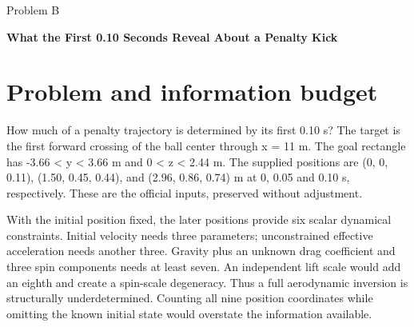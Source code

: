 \documentclass[11pt,a4paper]{article}
\begin{document}
\begin{titlepage}\thispagestyle{fancy}\fancyfoot{}
\centering\vspace*{0.4in}
{\Large Problem B\par}\vspace{0.35in}
{\LARGE\bfseries What the First 0.10 Seconds Reveal About a Penalty Kick\par}\vspace{0.35in}
\begin{abstract}
Predicting a penalty kick from only two positions after launch is an inverse problem with six dynamical constraints. We compare analytic constant-acceleration extrapolation, a gravity-plus-drag fit, and an aerodynamic ensemble that marginalizes unresolved drag, density and spin. Independent Gaussian coordinate errors are sensitivity assumptions, not measured camera specifications. In 1000 synthetic kicks observed through 0.10 s with 0.01 m coordinate noise, paired goal-plane RMSEs are 1.07, 0.45 and 0.41 m, respectively; the ensemble nominal 95\% ellipse covers 94.6\% of airborne truths. For the supplied kick, the conditional ensemble mean is (y, z) = (3.08, 1.92) m at 0.396 s, and the most likely spatial location is approximately (3.21, 1.90) m. The joint 95\% ellipse has semiaxes 0.61 and 0.64 m; geometric center-point goal probability is 96.5\% under the stated prior. Unknown aerodynamics dominate conditional position noise. Longer observation reduces point error in an extended experiment, while undercoverage accompanies low effective sample sizes. Short observations support conditional probabilistic predictions rather than unique spin recovery; independent aerodynamic and tracking measurements remain necessary for field calibration.
\end{abstract}
\end{titlepage}
\section{Problem and information budget}
How much of a penalty trajectory is determined by its first 0.10 s? The target is the first forward crossing of the ball center through x = 11 m. The goal rectangle has -3.66 < y < 3.66 m and 0 < z < 2.44 m. The supplied positions are (0, 0, 0.11), (1.50, 0.45, 0.44), and (2.96, 0.86, 0.74) m at 0, 0.05 and 0.10 s, respectively. These are the official inputs, preserved without adjustment.\cite{upc2026}

With the initial position fixed, the later positions provide six scalar dynamical constraints. Initial velocity needs three parameters; unconstrained effective acceleration needs another three. Gravity plus an unknown drag coefficient and three spin components needs at least seven. An independent lift scale would add an eighth and create a spin-scale degeneracy. Thus a full aerodynamic inversion is structurally underdetermined. Counting all nine position coordinates while omitting the known initial state would overstate the information available.
\end{document}

